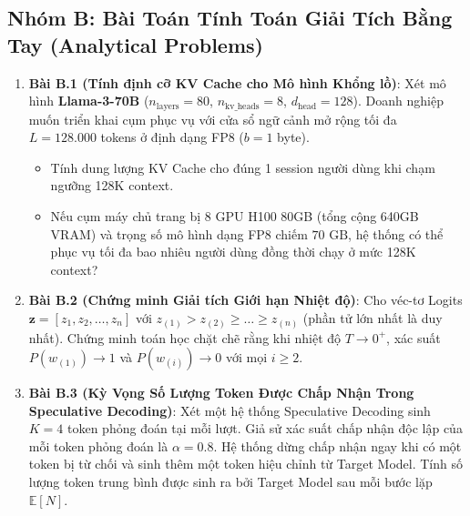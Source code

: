 \subsection{Nhóm B: Bài Toán Tính Toán Giải Tích Bằng Tay (Analytical Problems)}
\begin{enumerate}
  \item \textbf{Bài B.1 (Tính định cỡ KV Cache cho Mô hình Khổng lồ)}:
  Xét mô hình \textbf{Llama-3-70B} ($n_{\text{layers}} = 80$, $n_{\text{kv\_heads}} = 8$, $d_{\text{head}} = 128$).
  Doanh nghiệp muốn triển khai cụm phục vụ với cửa sổ ngữ cảnh mở rộng tối đa $L = 128.000$ tokens ở định dạng FP8 ($b = 1$ byte).
  \begin{itemize}
    \item[a)] Tính dung lượng KV Cache cho đúng 1 session người dùng khi chạm ngưỡng 128K context.
    \item[b)] Nếu cụm máy chủ trang bị 8 GPU H100 80GB (tổng cộng 640GB VRAM) và trọng số mô hình dạng FP8 chiếm $70\text{ GB}$, hệ thống có thể phục vụ tối đa bao nhiêu người dùng đồng thời chạy ở mức 128K context?
  \end{itemize}

  \item \textbf{Bài B.2 (Chứng minh Giải tích Giới hạn Nhiệt độ)}:
  Cho véc-tơ Logits $\mathbf{z} = [z_1, z_2, \dots, z_n]$ với $z_{(1)} > z_{(2)} \ge \dots \ge z_{(n)}$ (phần tử lớn nhất là duy nhất).
  Chứng minh toán học chặt chẽ rằng khi nhiệt độ $T \to 0^+$, xác suất $P(w_{(1)}) \to 1$ và $P(w_{(i)}) \to 0$ với mọi $i \ge 2$.

  \item \textbf{Bài B.3 (Kỳ Vọng Số Lượng Token Được Chấp Nhận Trong Speculative Decoding)}:
  Xét một hệ thống Speculative Decoding sinh $K = 4$ token phỏng đoán tại mỗi lượt. Giả sử xác suất chấp nhận độc lập của mỗi token phỏng đoán là $\alpha = 0.8$.
  Hệ thống dừng chấp nhận ngay khi có một token bị từ chối và sinh thêm một token hiệu chỉnh từ Target Model.
  Tính số lượng token trung bình được sinh ra bởi Target Model sau mỗi bước lặp $\mathbb{E}[N]$.
\end{enumerate}

